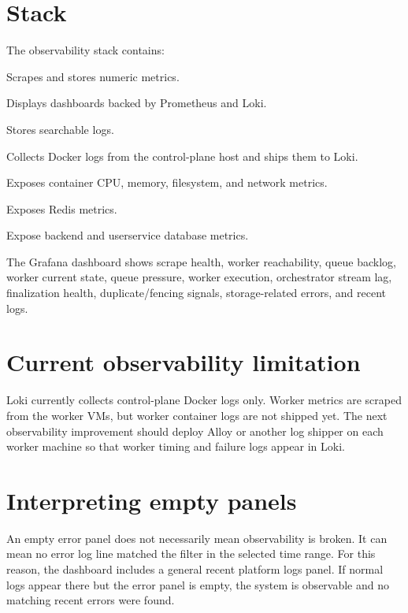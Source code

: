 \documentclass[12pt,a4paper]{report}
\begin{document}
\section{Stack}

The observability stack contains:

\begin{description}[leftmargin=3.0cm,style=nextline]
  \item[Prometheus] Scrapes and stores numeric metrics.
  \item[Grafana] Displays dashboards backed by Prometheus and Loki.
  \item[Loki] Stores searchable logs.
  \item[Grafana Alloy] Collects Docker logs from the control-plane host and ships them to Loki.
  \item[cAdvisor] Exposes container CPU, memory, filesystem, and network metrics.
  \item[Redis exporter] Exposes Redis metrics.
  \item[Postgres exporters] Expose backend and userservice database metrics.
\end{description}

The Grafana dashboard shows scrape health, worker reachability, queue backlog,
worker current state, queue pressure, worker execution, orchestrator stream
lag, finalization health, duplicate/fencing signals, storage-related errors,
and recent logs.

\section{Current observability limitation}

Loki currently collects control-plane Docker logs only. Worker metrics are
scraped from the worker VMs, but worker container logs are not shipped yet.
The next observability improvement should deploy Alloy or another log shipper
on each worker machine so that worker timing and failure logs appear in Loki.

\section{Interpreting empty panels}

An empty error panel does not necessarily mean observability is broken. It can
mean no error log line matched the filter in the selected time range. For this
reason, the dashboard includes a general recent platform logs panel. If normal
logs appear there but the error panel is empty, the system is observable and no
matching recent errors were found.
\end{document}
